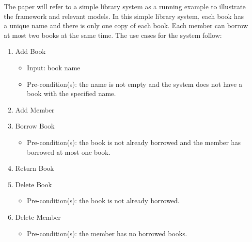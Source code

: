 %
%
\label{sec:running-example}
The paper will refer to a simple library system as a running example to illustrate the framework and relevant models. 
In this simple library system, each book has a unique name and there is only one copy of each book. Each member can borrow at most two books at the same time. The use cases for the system follow:
\begin{enumerate}
	\item Add Book 
	\begin{itemize}
		\item  Input: book name
		\item Pre-condition(s): the name is not empty and the system does not have a book with the specified name.
	\end{itemize}

	\item Add Member
	
	\item Borrow Book
	\begin{itemize}
		\item Pre-condition(s): the book is not already borrowed and the member has borrowed at most one book.
	\end{itemize}

	\item Return Book
	
	\item Delete Book
	\begin{itemize}
		\item Pre-condition(s): the book is not already borrowed.
	\end{itemize}

	\item Delete Member
	\begin{itemize}
		\item Pre-condition(s): the member has no borrowed books.
	\end{itemize}
\end{enumerate}
